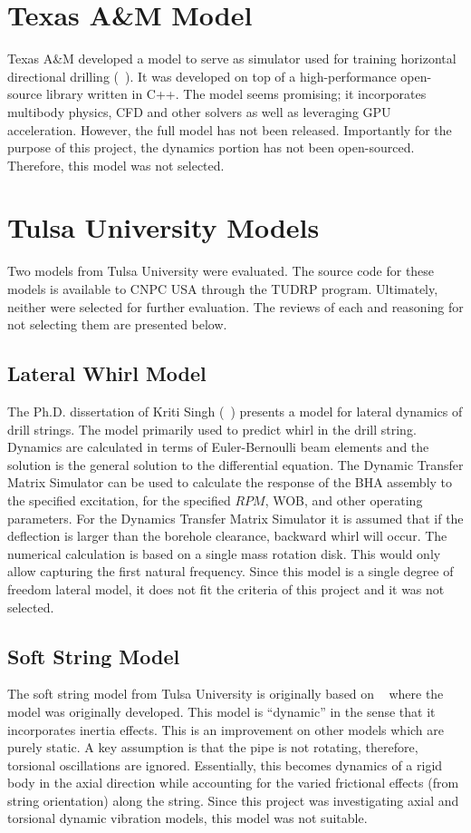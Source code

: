 \section{Texas A\&M Model}
Texas A\&M developed a model to serve as simulator used for training horizontal directional drilling (~\cite{ref:losoya2020a}).  It was developed on top of a high-performance open-source library written in C++.  The model seems promising; it incorporates multibody physics, CFD and other solvers as well as leveraging GPU acceleration.  However, the full model has not been released.  Importantly for the purpose of this project, the dynamics portion has not been open-sourced.  Therefore, this model was not selected.

\section{Tulsa University Models}
Two models from Tulsa University were evaluated.  The source code for these models is available to CNPC USA through the TUDRP program. Ultimately, neither were selected for further evaluation.  The reviews of each and reasoning for not selecting them are presented below.

\subsection{Lateral Whirl Model}
The Ph.D. dissertation of Kriti Singh (~\cite{ref:singh2019a}) presents a model for lateral dynamics of drill  strings.  The model primarily used to predict whirl in the drill string.  Dynamics are calculated in terms of Euler-Bernoulli beam elements and the solution is the general solution to the differential equation.  The Dynamic Transfer Matrix Simulator can be used to calculate the response of the BHA assembly to the specified excitation, for the specified $RPM$, WOB, and other operating parameters.  For the Dynamics Transfer Matrix Simulator it is assumed that if the deflection is larger than the borehole clearance, backward whirl will occur.  The numerical calculation is based on a single mass rotation disk.  This would only allow capturing the first natural frequency.  Since this model is a single degree of freedom lateral model, it does not fit the criteria of this project and it was not selected.

\subsection{Soft String Model}
The soft string model from Tulsa University is originally based on ~\cite{ref:miska2015a} where the model was originally developed.  This model is ``dynamic'' in the sense that it incorporates inertia effects.  This is an improvement on other models which are purely static.  A key assumption is that the pipe is not rotating, therefore, torsional oscillations are ignored.  Essentially, this becomes dynamics of a rigid body in the axial direction while accounting for the varied frictional effects (from string orientation) along the string.  Since this project was investigating axial and torsional dynamic vibration models, this model was not suitable.

